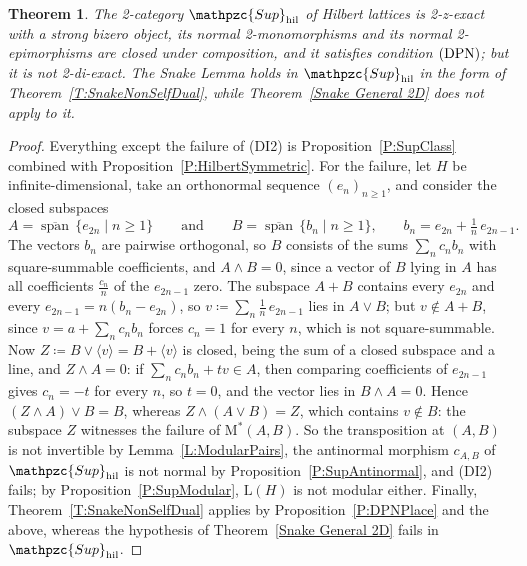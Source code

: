 \documentclass[reqno,a4paper]{amsart}
\numberwithin{equation}{section}
\theoremstyle{plain}
\newtheorem{theorem}[subsection]{Theorem}
\theoremstyle{definition}
\def\nameit#1{\textrm{#1}~}
\def\thex{\nameit{Theorem}}
\def\prox{\nameit{Proposition}}
\def\lemx{\nameit{Lemma}}
\newcommand{\Suphil}{\ensuremath{\mathpzc{Sup}_{\mathrm{hil}}}}
\renewcommand{\1}{\onecat{1}}
\newcommand{\Lat}{\ensuremath{\mathrm{L}}}
\newcommand{\DPN}{\textup{(DPN)}}
\begin{document}
\begin{theorem}\label{T:HilbertModel}
	The 2-category \(\Suphil\) of Hilbert lattices is 2-z-exact with a strong bizero object, its normal 2-monomorphisms and its normal 2-epimorphisms are closed under composition, and it satisfies condition \(\DPN\); but it is not 2-di-exact. The Snake Lemma holds in \(\Suphil\) in the form of \thex\ref{T:SnakeNonSelfDual}, while \thex\ref{Snake General 2D} does not apply to it.
\end{theorem}
\begin{proof}
	Everything except the failure of \textup{(DI2)} is \prox\ref{P:SupClass} combined with \prox\ref{P:HilbertSymmetric}. For the failure, let \(H\) be infinite-dimensional, take an orthonormal sequence \((e_{n})_{n\geq1}\), and consider the closed subspaces
	\[
		A=\overline{\operatorname{span}}\,\{e_{2n}\mid n\geq1\}\qquad\text{and}\qquad B=\overline{\operatorname{span}}\,\{b_{n}\mid n\geq1\}\text{,}\qquad b_{n}=e_{2n}+\tfrac{1}{n}\,e_{2n-1}\text{.}
	\]
	The vectors \(b_{n}\) are pairwise orthogonal, so \(B\) consists of the sums \(\sum_{n}c_{n}b_{n}\) with square-summable coefficients, and \(A\wedge B=0\), since a vector of \(B\) lying in \(A\) has all coefficients \(\tfrac{c_{n}}{n}\) of the \(e_{2n-1}\) zero. The subspace \(A+B\) contains every \(e_{2n}\) and every \(e_{2n-1}=n(b_{n}-e_{2n})\), so \(v\coloneq\sum_{n}\tfrac{1}{n}\,e_{2n-1}\) lies in \(A\vee B\); but \(v\notin A+B\), since \(v=a+\sum_{n}c_{n}b_{n}\) forces \(c_{n}=1\) for every \(n\), which is not square-summable. Now \(Z\coloneq B\vee\langle v\rangle=B+\langle v\rangle\) is closed, being the sum of a closed subspace and a line, and \(Z\wedge A=0\): if \(\sum_{n}c_{n}b_{n}+tv\in A\), then comparing coefficients of \(e_{2n-1}\) gives \(c_{n}=-t\) for every \(n\), so \(t=0\), and the vector lies in \(B\wedge A=0\). Hence \((Z\wedge A)\vee B=B\), whereas \(Z\wedge(A\vee B)=Z\), which contains \(v\notin B\): the subspace \(Z\) witnesses the failure of \(\mathrm{M}^{*}(A,B)\). So the transposition at \((A,B)\) is not invertible by \lemx\ref{L:ModularPairs}, the antinormal morphism \(c_{A,B}\) of \(\Suphil\) is not normal by \prox\ref{P:SupAntinormal}, and \textup{(DI2)} fails; by \prox\ref{P:SupModular}, \(\Lat(H)\) is not modular either. Finally, \thex\ref{T:SnakeNonSelfDual} applies by \prox\ref{P:DPNPlace} and the above, whereas the hypothesis of \thex\ref{Snake General 2D} fails in \(\Suphil\).
\end{proof}
\end{document}
